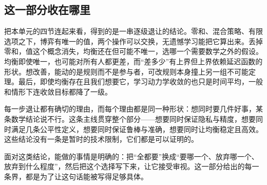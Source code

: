 \subsection{这一部分收在哪里}

把本单元的四节连起来看，得到的是一串逐级退让的结论。零和、混合策略、有限选项之下，博弈有唯一的值，两个操作可以交换，无遗憾学习能把它算出来。丢掉零和，值这个概念消失，均衡还在但可能不唯一，选哪一个需要数学之外的假设。均衡即使唯一，也可能对所有人都更差，而``差多少''有上界但上界依赖延迟函数的形状。想改善，能动的是规则而不是参与者，可改规则本身撞上另一组不可能定理。最后，即使均衡存在且我们想要它，学习动力学收敛的也只是时间平均，一般和情形下连收敛目标都降了一级。

每一步退让都有确切的理由，而每个理由都是同一种形状：想同时要几件好事，某条数学结论说不行。这条主线贯穿整个部分——想要同时保证隐私与精度，想要同时满足几条公平性定义，想要同时保证鲁棒与准确，想要同时让均衡稳定且高效。这些结论没有一条是暂时的技术限制，它们都是可以证明的。

面对这类结论，能做的事情是明确的：把``全都要''换成``要哪一个、放弃哪一个、放弃到什么程度''，然后把这个选择写下来，让它接受审视。这一部分给出的每一条界，都是为了让这句话能被写得足够具体。
